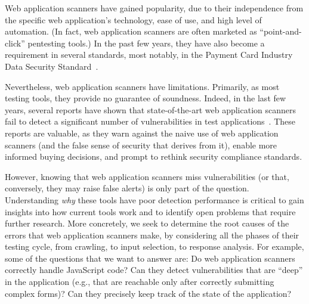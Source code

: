 Web application scanners have gained popularity, due to
their independence from the specific web application's technology, ease of
use, and high level of automation. (In fact, web application scanners
are often marketed as ``point-and-click'' pentesting tools.) In the past
few years, they have also become a requirement in several standards,
most notably, in the Payment Card Industry Data Security
Standard~\cite{pci}.


Nevertheless, web application scanners have limitations. 
Primarily, as most testing tools, they provide no guarantee of
soundness.
Indeed, in the last few years, several reports have shown that
state-of-the-art web application scanners fail to detect a significant
number of vulnerabilities in test applications~\cite{suto07,suto10:webscanners,wiegenstein06,peine06,anantasec09}.
These reports are valuable, as they warn against the naive use of web
application scanners (and the false sense of security that derives from
it), enable more informed buying decisions, and  prompt to rethink
security compliance standards. 

However, knowing that web application scanners miss vulnerabilities (or
that, conversely, they may raise false alerts) is only part of the
question. Understanding {\em why} these tools have poor detection
performance is critical to gain insights into how current tools work and
to identify open problems that require further research.  
%
More concretely, we seek to determine the root causes of the
errors that web application scanners make, by considering all the phases
of their testing cycle, from crawling, to input selection, to response
analysis.
%
For example, some of the questions that we want to
answer are: Do web application scanners correctly handle JavaScript
code? Can they detect vulnerabilities that are ``deep'' in the
application (e.g., that are reachable only after correctly submitting
complex forms)? Can they precisely keep track of the state of the
application?

